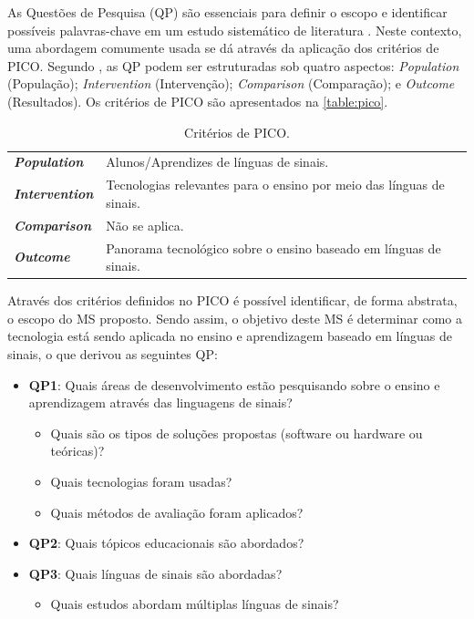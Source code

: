 As Questões de Pesquisa (QP) são essenciais para definir o escopo e identificar possíveis palavras-chave em um estudo sistemático de literatura \cite{Kitchenham2007,Petersen2015}. Neste contexto, uma abordagem comumente usada se dá através da aplicação dos critérios de PICO. Segundo , as QP podem ser estruturadas sob quatro aspectos: \textit{Population} (População); \textit{Intervention} (Intervenção); \textit{Comparison} (Comparação); e \textit{Outcome} (Resultados). Os critérios de PICO são apresentados na \autoref{table:pico}.

\begin{table}[!ht]
\caption{Critérios de PICO.}
\label{table:pico}
\centering
\begin{tabular}{ll}
\toprule
\textbf{\textit{Population}} & Alunos/Aprendizes de línguas de sinais. \\
\textbf{\textit{Intervention}} & Tecnologias relevantes para o ensino por meio das línguas de sinais. \\
\textbf{\textit{Comparison}} & Não se aplica. \\
\textbf{\textit{Outcome}} & Panorama tecnológico sobre o ensino baseado em línguas de sinais. \\ 
\bottomrule
\end{tabular}
\fautor
\end{table}

Através dos critérios definidos no PICO é possível identificar, de forma abstrata, o escopo do MS proposto. Sendo assim, o objetivo deste MS é determinar como a tecnologia está sendo aplicada no ensino e aprendizagem baseado em línguas de sinais, o que derivou as seguintes QP:

\begin{itemize}
    \item \textbf{QP1}: Quais áreas de desenvolvimento estão pesquisando sobre o ensino e aprendizagem através das linguagens de sinais?
    \begin{itemize}
        \item Quais são os tipos de soluções propostas (software ou hardware ou teóricas)?
        \item Quais tecnologias foram usadas?
        \item Quais métodos de avaliação foram aplicados?
    \end{itemize}
    \item \textbf{QP2}: Quais tópicos educacionais são abordados?
    \item \textbf{QP3}: Quais línguas de sinais são abordadas?
    \begin{itemize}
        \item Quais estudos abordam múltiplas línguas de sinais?
    \end{itemize}
\end{itemize}

